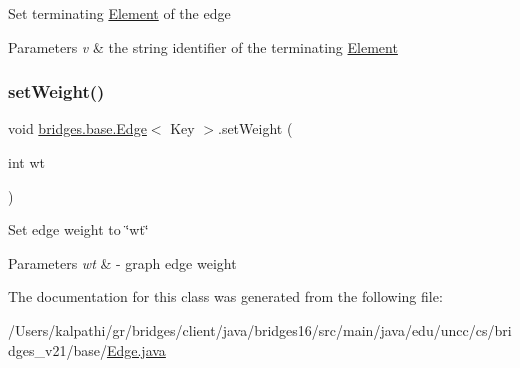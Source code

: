 Set terminating \hyperlink{classbridges_1_1base_1_1_element}{Element} of the edge


\begin{DoxyParams}{Parameters}
{\em v} & the string identifier of the terminating \hyperlink{classbridges_1_1base_1_1_element}{Element} \\
\hline
\end{DoxyParams}
\hypertarget{classbridges_1_1base_1_1_edge_a5b671fc2589d95b125b0b2cedbab0f1a}{}\label{classbridges_1_1base_1_1_edge_a5b671fc2589d95b125b0b2cedbab0f1a} 
\subsubsection{\texorpdfstring{set\+Weight()}{setWeight()}}
{\footnotesize\ttfamily void \hyperlink{classbridges_1_1base_1_1_edge}{bridges.\+base.\+Edge}$<$ Key $>$.set\+Weight (\begin{DoxyParamCaption}\item[{int}]{wt }\end{DoxyParamCaption})}

Set edge weight to \char`\"{}wt\char`\"{}


\begin{DoxyParams}{Parameters}
{\em wt} & -\/ graph edge weight \\
\hline
\end{DoxyParams}


The documentation for this class was generated from the following file\+:\begin{DoxyCompactItemize}
\item 
/\+Users/kalpathi/gr/bridges/client/java/bridges16/src/main/java/edu/uncc/cs/bridges\+\_\+v21/base/\hyperlink{_edge_8java}{Edge.\+java}\end{DoxyCompactItemize}
